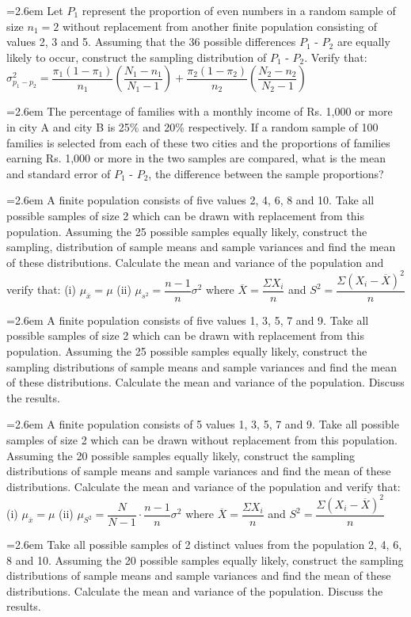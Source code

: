 \documentclass[11pt,a4paper]{article}
\newcommand{\Q}[2]{\par\smallskip\noindent\hangindent=2.6em\hangafter=1
  \makebox[2.6em][l]{\textbf{#1.}}#2\par}
\begin{document}
\Q{115}{Let $P_{1}$ represent the proportion of even numbers in a random sample of size $n_{1}=2$ without replacement from another finite population consisting of values 2, 3 and 5. Assuming that the 36 possible differences $P_{1}$ - $P_{2}$ are equally likely to occur, construct the sampling distribution of $P_{1}$ - $P_{2}$. Verify that: $\sigma^{2}_{p_{1}-p_{2}}=\dfrac{\pi_{1}(1-\pi_{1})}{n_{1}}\left(\dfrac{N_{1}-n_{1}}{N_{1}-1}\right)+\dfrac{\pi_{2}(1-\pi_{2})}{n_{2}}\left(\dfrac{N_{2}-n_{2}}{N_{2}-1}\right)$}
\Q{116}{The percentage of families with a monthly income of Rs. 1,000 or more in city A and city B is 25\% and 20\% respectively. If a random sample of 100 families is selected from each of these two cities and the proportions of families earning Rs. 1,000 or more in the two samples are compared, what is the mean and standard error of $P_{1}$ - $P_{2}$, the difference between the sample proportions?}
\Q{117}{A finite population consists of five values 2, 4, 6, 8 and 10. Take all possible samples of size 2 which can be drawn with replacement from this population. Assuming the 25 possible samples equally likely, construct the sampling, distribution of sample means and sample variances and find the mean of these distributions. Calculate the mean and variance of the population and verify that: (i) $\mu_{\overline{x}}=\mu$ (ii) $\mu_{s^{2}}=\dfrac{n-1}{n}\sigma^{2}$ where $\overline{X}=\dfrac{\Sigma X_{i}}{n}$ and $S^{2}=\dfrac{\Sigma(X_{i}-\overline{X})^{2}}{n}$}
\Q{118}{A finite population consists of five values 1, 3, 5, 7 and 9. Take all possible samples of size 2 which can be drawn with replacement from this population. Assuming the 25 possible samples equally likely, construct the sampling distributions of sample means and sample variances and find the mean of these distributions. Calculate the mean and variance of the population. Discuss the results.}
\Q{119}{A finite population consists of 5 values 1, 3, 5, 7 and 9. Take all possible samples of size 2 which can be drawn without replacement from this population. Assuming the 20 possible samples equally likely, construct the sampling distributions of sample means and sample variances and find the mean of these distributions. Calculate the mean and variance of the population and verify that: (i) $\mu_{\overline{x}}=\mu$ (ii) $\mu_{S^{2}}=\dfrac{N}{N-1}\cdot\dfrac{n-1}{n}\sigma^{2}$ where $\overline{X}=\dfrac{\Sigma X_{i}}{n}$ and $S^{2}=\dfrac{\Sigma(X_{i}-\overline{X})^{2}}{n}$}
\Q{120}{Take all possible samples of 2 distinct values from the population 2, 4, 6, 8 and 10. Assuming the 20 possible samples equally likely, construct the sampling distributions of sample means and sample variances and find the mean of these distributions. Calculate the mean and variance of the population. Discuss the results.}
\end{document}
